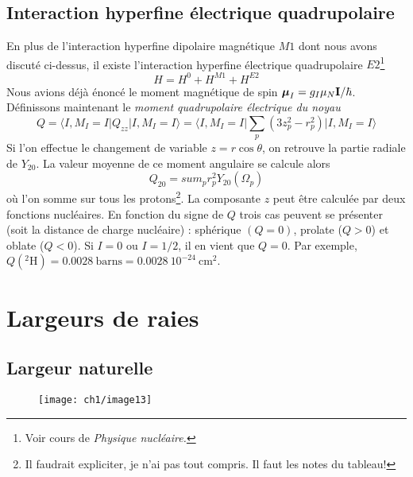 \subsection{Interaction hyperfine électrique quadrupolaire}
En plus de l'interaction hyperfine dipolaire magnétique $M1$ dont nous avons discuté ci-dessus, il
existe l'interaction hyperfine électrique quadrupolaire $E2$\footnote{Voir cours de \textit{Physique
nucléaire.}}
\begin{equation}
H = H^0 + H^{M1} + H^{E2}
\end{equation}
Nous avions déjà énoncé le moment magnétique de spin $\mbox{\boldmath $ \mu $}_I = g_I \mu_N {\bf I}/
\hbar$. Définissons maintenant le \textit{moment quadrupolaire électrique du noyau}
\begin{equation}
Q = \langle I, M_I=I \vert Q_{zz} \vert I, M_I=I \rangle
= \langle I, M_I=I \vert \sum_p (3 z^2_p - r^2_p)  \vert I, M_I=I \rangle
\end{equation}
Si l'on effectue le changement de variable $z=r\cos\theta$, on retrouve la partie radiale de 
$Y_{20}$. La valeur moyenne de ce moment angulaire se calcule alors
\begin{equation}
Q_{20} = sum_p r_p^2 Y_{20}(\Omega_p)
\end{equation}
où l'on somme sur tous les protons\footnote{Il faudrait expliciter, je n'ai pas tout compris. Il 
faut les notes du tableau!}. La composante $z$ peut être calculée par deux fonctions
nucléaires. En fonction du signe de $Q$ trois cas peuvent se présenter (soit la distance de charge 
nucléaire) : sphérique $(Q=0)$, prolate ($Q>0$) et oblate ($Q<0$). Si $I=0$ ou $I=1/2$, il en vient
que $Q=0$. Par exemple, $Q(^2\mbox{H}) = 0.0028~\mbox{barns} = 0.0028~10^{-24}~\mbox{cm}^{2}$.



\section{Largeurs de raies}
\subsection{Largeur naturelle}

	\begin{wrapfigure}[15]{r}{5cm}
	\vspace{-5mm}
	\texttt{[image: ch1/image13]}
	\end{wrapfigure}
	
